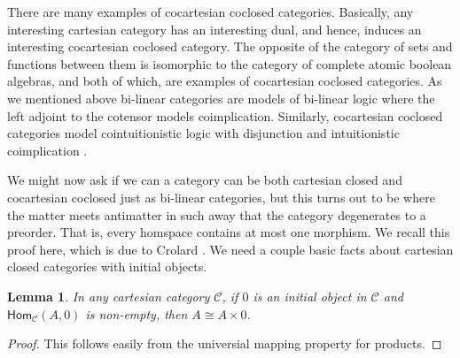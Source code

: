\documentclass{lmcs}
\newtheorem{lemma}[theorem]{Lemma}
\newcommand{\cat}[1]{\mathcal{#1}}
\newcommand{\Hom}[3]{\mathsf{Hom}_{\cat{#1}}(#2,#3)}
\begin{document}
There are many examples of cocartesian coclosed categories.
Basically, any interesting cartesian category has an interesting dual,
and hence, induces an interesting cocartesian coclosed category.
The opposite of the category of sets and functions between them is
isomorphic to the category of complete atomic boolean algebras, and
both of which, are examples of cocartesian coclosed categories.  As
we mentioned above bi-linear categories \cite{Cockett:1997a} are
models of bi-linear logic where the left adjoint to the cotensor
models coimplication.  Similarly, cocartesian coclosed categories
model cointuitionistic logic with disjunction and intuitionistic
coimplication \cite{Crolard:2001,Bellin:2012}. 

We might now ask if we can a category can be both cartesian closed and
cocartesian coclosed just as bi-linear categories, but this turns out
to be where the matter meets antimatter in such away that the category
degenerates to a preorder.  That is, every homspace contains at most
one morphism.  We recall this proof here, which is due to Crolard
\cite{Crolard:2001}. We need a couple basic facts about cartesian
closed categories with initial objects.
\begin{lemma}
  \label{lemma:iso-prod-initial}
  In any cartesian category $\cat{C}$, if $0$ is an initial object in
  $\cat{C}$ and $\Hom{C}{A}{0}$ is non-empty, then $A \cong A \times 0$.
\end{lemma}
\begin{proof}
  This follows easily from the universial mapping property for products.
\end{proof}
\end{document}
